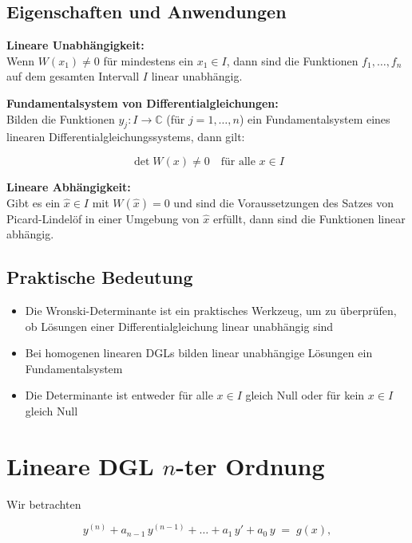 \documentclass[a4paper,11pt,oneside,open=any,parskip=half, DIV=15]{scrreprt}
\begin{document}
   \subsection*{Eigenschaften und Anwendungen}

      \textbf{Lineare Unabhängigkeit:} \\
      Wenn \(W(x_1) \neq 0\) für mindestens ein \(x_1 \in I\), dann sind die Funktionen \(f_1, \ldots, f_n\) auf dem gesamten Intervall \(I\) linear unabhängig.


      \textbf{Fundamentalsystem von Differentialgleichungen:} \\
      Bilden die Funktionen \(y_j : I \to \mathbb{C}\) (für \(j = 1, \ldots, n\)) ein Fundamentalsystem eines linearen Differentialgleichungssystems, dann gilt:
      \begin{importantbox}
         \[
            \det W(x) \neq 0 \quad \text{für alle } x \in I
         \]         
      \end{importantbox}

      \textbf{Lineare Abhängigkeit:} \\
      Gibt es ein \(\hat{x} \in I\) mit \(W(\hat{x}) = 0\) und sind die Voraussetzungen des Satzes von Picard-Lindelöf in einer Umgebung von \(\hat{x}\) erfüllt, dann sind die Funktionen linear abhängig.


   \subsection*{Praktische Bedeutung}
      \begin{itemize}
         \item Die Wronski-Determinante ist ein praktisches Werkzeug, um zu überprüfen, ob Lösungen einer Differentialgleichung linear unabhängig sind
         \item Bei homogenen linearen DGLs bilden linear unabhängige Lösungen ein Fundamentalsystem
         \item Die Determinante ist entweder für alle \(x \in I\) gleich Null oder für kein \(x \in I\) gleich Null
      \end{itemize}

\section[Lineare DGL n-ter Ordnung]{Lineare DGL \texorpdfstring{$n$\nobreakdash-ter Ordnung}{n-ter Ordnung}}

   Wir betrachten
   \begin{importantbox}
      \[
         y^{(n)} + a_{n-1}\,y^{(n-1)} + \dots + a_{1}\,y' + a_{0}\,y \;=\; g(x), %
      \]
   \end{importantbox}
\end{document}
